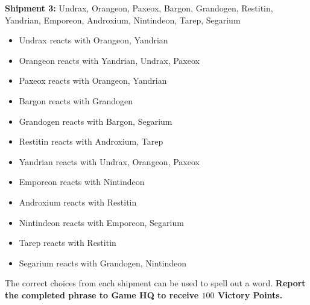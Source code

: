 \begin{puzzle}
  \newpage

  \noindent
  \textbf{Shipment 3:} Undrax, Orangeon, Paxeox, Bargon, Grandogen, Restitin, Yandrian, Emporeon, Androxium, Nintindeon, Tarep, Segarium

  \begin{itemize}
    \item Undrax reacts with Orangeon, Yandrian
    \item Orangeon reacts with Yandrian, Undrax, Paxeox
    \item Paxeox reacts with Orangeon, Yandrian
    \item Bargon reacts with Grandogen
    \item Grandogen reacts with Bargon, Segarium
    \item Restitin reacts with Androxium, Tarep
    \item Yandrian reacts with Undrax, Orangeon, Paxeox
    \item Emporeon reacts with Nintindeon
    \item Androxium reacts with Restitin
    \item Nintindeon reacts with Emporeon, Segarium
    \item Tarep reacts with Restitin
    \item Segarium reacts with Grandogen, Nintindeon
  \end{itemize}


  \vfill

\noindent
The correct choices from each shipment can be used to spell out a word.
\textbf{Report the completed phrase to Game HQ to receive \(100\)
Victory Points.}


\vfill
\begin{center}
    \hspace{1em}
\end{center}
\begin{center}
\end{center}
\vfill

\end{puzzle}

